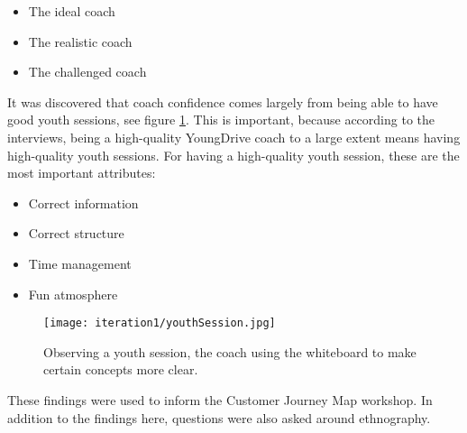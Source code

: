 \begin{itemize}
  \item The ideal coach
  \item The realistic coach
  \item The challenged coach
\end{itemize}

It was discovered that coach confidence comes largely from being able to have good youth sessions, see figure \ref{fig:youthSession1}. This is important, because according to the interviews, being a high-quality YoungDrive coach to a large extent means having high-quality youth sessions. For having a high-quality youth session, these are the most important attributes:

\begin{itemize}
  \item Correct information
  \item Correct structure
  \item Time management
  \item Fun atmosphere
\end{itemize}

\begin{figure}[h]
  \centering
  \texttt{[image: iteration1/youthSession.jpg]}
  \caption{Observing a youth session, the coach using the whiteboard to make certain concepts more clear.}
  \label{fig:youthSession1}
\end{figure}

These findings were used to inform the Customer Journey Map workshop. In addition to the findings here, questions were also asked around ethnography.


